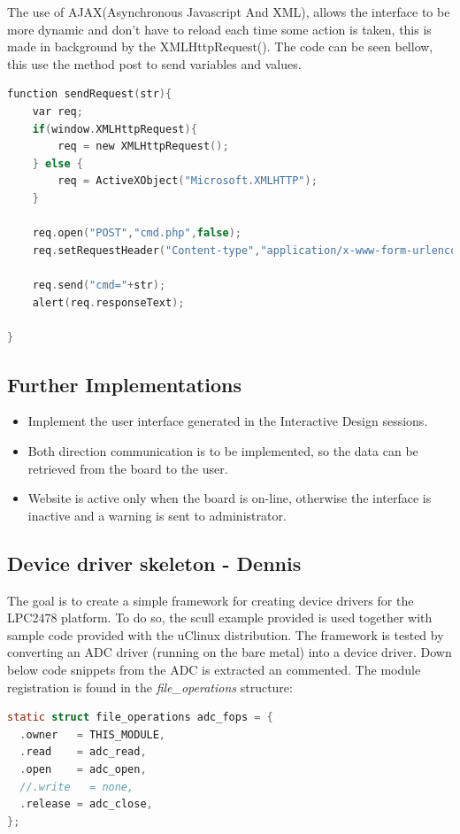 The use of AJAX(Asynchronous Javascript And XML), allows the interface to be more dynamic and don't have to reload each time some action is taken, this is made in background by the XMLHttpRequest(). The code can be seen bellow, this use the method post to send variables and values.

\begin{lstlisting}[language=c]
function sendRequest(str){
	var req;
	if(window.XMLHttpRequest){
		req	= new XMLHttpRequest();
	} else {
		req = ActiveXObject("Microsoft.XMLHTTP");	
	}

	req.open("POST","cmd.php",false);
	req.setRequestHeader("Content-type","application/x-www-form-urlencoded");
	
	req.send("cmd="+str);
	alert(req.responseText);

}
\end{lstlisting}

\subsection{Further Implementations}
\begin{itemize}
	\item Implement the user interface generated in the Interactive Design sessions.
	\item Both direction communication is to be implemented, so the data can be retrieved from the board to the user.
	\item Website is active only when the board is on-line, otherwise the interface is inactive and a warning is sent to administrator.
\end{itemize}

\subsection{Device driver skeleton - Dennis}
The goal is to create a simple framework for creating device drivers for the LPC2478 platform. To do so, the scull example provided is used together with sample code provided with the uClinux distribution. The framework is tested by converting an ADC driver (running on the bare metal) into a device driver. Down below code snippets from the ADC is extracted an commented. 
\p The module registration is found in the \textit{file\_operations} structure:
\begin{lstlisting}[language=c]
static struct file_operations adc_fops = {
  .owner   = THIS_MODULE,
  .read    = adc_read,
  .open    = adc_open,
  //.write   = none,
  .release = adc_close,
};
\end{lstlisting}

